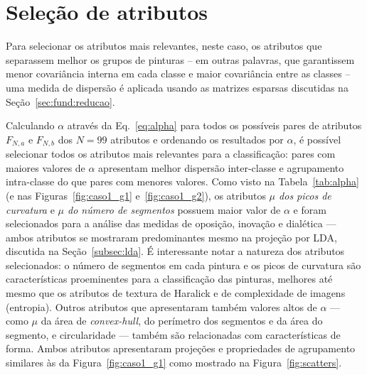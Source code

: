 

\section{Seleção de atributos}

Para selecionar os atributos mais relevantes, neste caso, os atributos que
separassem melhor os grupos de pinturas -- em outras palavras, que garantissem
menor covariância interna em cada classe e maior covariância entre as classes --
uma medida de dispersão é aplicada usando as matrizes esparsas discutidas na
Seção~\ref{sec:fund:reducao}.

Calculando $\alpha$ através da Eq.~\ref{eq:alpha} para todos os possíveis pares
de atributos $F_{N, a}$ e $F_{N, b}$ dos $N = 99$ atributos e ordenando os
resultados por $\alpha$, é possível selecionar todos os atributos mais
relevantes para a classificação: pares com maiores valores de $\alpha$
apresentam melhor dispersão inter-classe e agrupamento intra-classe do que pares
com menores valores. Como visto na Tabela~\ref{tab:alpha} (e nas
Figuras~\ref{fig:caso1_g1} e~\ref{fig:caso1_g2}), os atributos \emph{$\mu$ dos
  picos de curvatura} e \emph{$\mu$ do número de segmentos} possuem maior valor
de $\alpha$ e foram selecionados para a análise das medidas de oposição,
inovação e dialética --- ambos atributos se mostraram predominantes mesmo na
projeção por LDA, discutida na Seção~\ref{subsec:lda}. É interessante notar a
natureza dos atributos selecionados: o número de segmentos em cada pintura e os
picos de curvatura são características proeminentes para a classificação das
pinturas, melhores até mesmo que os atributos de textura de Haralick e de
complexidade de imagens (entropia). Outros atributos que apresentaram também
valores altos de $\alpha$ --- como $\mu$ da área de \textit{convex-hull}, do
perímetro dos segmentos e da área do segmento, e circularidade --- também são
relacionadas com características de forma. Ambos atributos apresentaram
projeções e propriedades de agrupamento similares às da
Figura~\ref{fig:caso1_g1} como mostrado na Figura~\ref{fig:scatters}.
 
